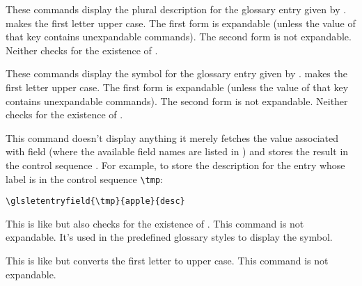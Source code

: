 \documentclass[report,inlinetitle]{nlctdoc}
\begin{document}
\begin{definition}[\DescribeMacro{\glsentrydescplural}]
\end{definition}
\begin{definition}[\DescribeMacro{\Glsentrydescplural}]
\end{definition}
These commands display the plural description for the glossary entry
given by .  makes the first
letter upper case.
The first form is expandable (unless the value of that key contains unexpandable
commands). The second form is not expandable. Neither checks for the
existence of .


\begin{definition}[\DescribeMacro{\glsentrysymbol}]
\end{definition}
\begin{definition}[\DescribeMacro{\Glsentrysymbol}]
\end{definition}
These commands display the symbol for the glossary entry given by
.  makes the first letter upper case.
The first form is expandable (unless the value of that key contains unexpandable
commands). The second form is not expandable. Neither checks for the
existence of .


\begin{definition}[\DescribeMacro\glsletentryfield]
\end{definition}
This command doesn't display anything it merely fetches the
value associated with field (where the available field names 
are listed in ) and stores the result
in the control sequence . For example, to store
the description for the entry whose label is  in the
control sequence \verb|\tmp|:
\begin{verbatim}
\glsletentryfield{\tmp}{apple}{desc}
\end{verbatim}

\begin{definition}[\DescribeMacro{\glossentrysymbol}]
\end{definition}
This is like 
but also checks for the existence of . This command is
not expandable. It's used in the predefined glossary styles to
display the symbol.
\begin{definition}[\DescribeMacro{\Glossentrysymbol}]
\end{definition}
This is like  but converts the first letter to
upper case. This command is not expandable.
\end{document}
